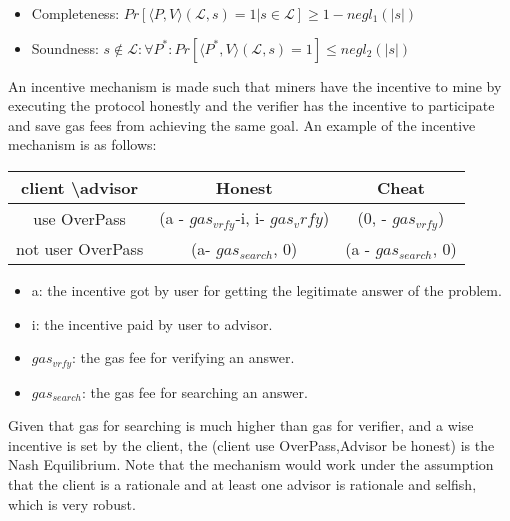 \begin{itemize}
    \item Completeness: $Pr[\langle P,V\rangle(\mathcal{L},s)=1|s\in \mathcal{L}]\geq 1-negl_1(|s|)$
    \item Soundness:  $s\notin \mathcal{L}:\forall P^*: Pr[\langle P^*,V\rangle(\mathcal{L},s)=1]\leq negl_2(|s|)$
\end{itemize}
An incentive mechanism is made such that miners have the incentive to mine by executing the protocol honestly and the verifier has the incentive to participate and save gas fees from achieving the same goal. An example of the incentive mechanism is as follows:
\begin{footnotesize}
\begin{table}[H]
\begin{tabular}{|c|c|c|}
\hline
client \textbackslash advisor & Honest                          & Cheat                \\ \hline
use OverPass                  & (a - $gas_{vrfy}$-i, i- $gas_vrfy$) & (0, - $gas_{vrfy}$)     \\ \hline
not user OverPass             & (a- $gas_{search}$, 0)             & (a - $gas_{search}$, 0) \\ \hline
\end{tabular}
\end{table}
\end{footnotesize}
\begin{itemize}
    \item a: the incentive got by user for getting the legitimate answer of the problem.
    \item i: the incentive paid by user to advisor.
    \item $gas_{vrfy}$: the gas fee for verifying an answer.
    \item $gas_{search}$: the gas fee for searching an answer.
\end{itemize}
Given that gas for searching is much higher than gas for verifier, and a wise incentive is set by the client, the (client use OverPass,Advisor be honest) is the Nash Equilibrium. Note that the mechanism would work under the assumption that the client is a rationale and at least one advisor is rationale and selfish, which is very robust.
